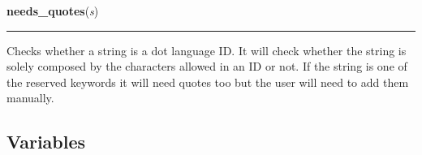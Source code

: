 \hspace{.8\funcindent}\begin{boxedminipage}{\funcwidth}

    \raggedright \textbf{needs\_quotes}(\textit{s})

    \vspace{-1.5ex}

    \rule{\textwidth}{0.5\fboxrule}
\setlength{\parskip}{2ex}
    Checks whether a string is a dot language ID. It will check whether the
    string is solely composed by the characters allowed in an ID or not. If
    the string is one of the reserved keywords it will need quotes too but 
    the user will need to add them manually.

\setlength{\parskip}{1ex}
    \end{boxedminipage}



  \subsection{Variables}

